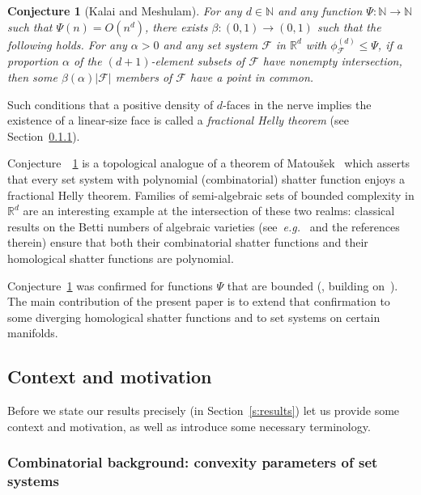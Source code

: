 \documentclass[a4paper,UKenglish,thm-restate]{article}
\newcommand{\R}{\mathbb{R}}
\newcommand{\N}{\mathbb{N}}
\newcommand{\F}{\mathcal{F}}
\newtheorem{conjecture}[theorem]{Conjecture}
\begin{document}
\begin{conjecture}[Kalai and Meshulam]
    \label{conj:kalai-meshulam}
    For any $d \in \N$ and any function $\Psi: \N \to \N$ such that $\Psi(n) = O(n^d)$, there exists $\beta: (0,1) \to (0,1)$ such that the following holds. For any $\alpha>0$ and any set system $\F$ in $\R^d$ with $\phi_{\F}^{(d)} \le \Psi$, if a proportion $\alpha$ of the $(d+1)$-element subsets of $\F$ have nonempty intersection, then some $\beta(\alpha)|\F|$ members of $\F$ have a point in common.
\end{conjecture}

\noindent
Such conditions that a positive density of $d$-faces in the nerve implies the existence of a linear-size face is called a \emph{fractional Helly theorem} (see Section~\ref{s:cbk}).

\medskip

Conjecture~~\ref{conj:kalai-meshulam} is a topological analogue of a theorem of Matou\v sek~\cite{matousek2004bounded} which asserts that every set system with polynomial (combinatorial) shatter function enjoys a fractional Helly theorem. Families of semi-algebraic sets of bounded complexity in $\R^d$ are an interesting example at the intersection of these two realms: classical results on the Betti numbers of algebraic varieties (see~\emph{e.g.}~\cite{basu2018multi} and the references therein) ensure that both their combinatorial shatter functions and their homological shatter functions are polynomial.

\medskip

Conjecture~\ref{conj:kalai-meshulam} was confirmed for functions $\Psi$ that are bounded (\cite[Corollary~1.3]{steppingUp}, building on~\cite{Holmsen2020,Holmsen2021,patakova2022bounding}). The main contribution of the present paper is to extend that confirmation to some diverging homological shatter functions and to set systems on certain manifolds. 


\subsection{Context and motivation}\label{s:context}

Before we state our results precisely (in Section~\ref{s:results}) let us provide some context and motivation, as well as introduce some necessary terminology.


\subsubsection{Combinatorial background: convexity parameters of set systems}\label{s:cbk}
\end{document}
